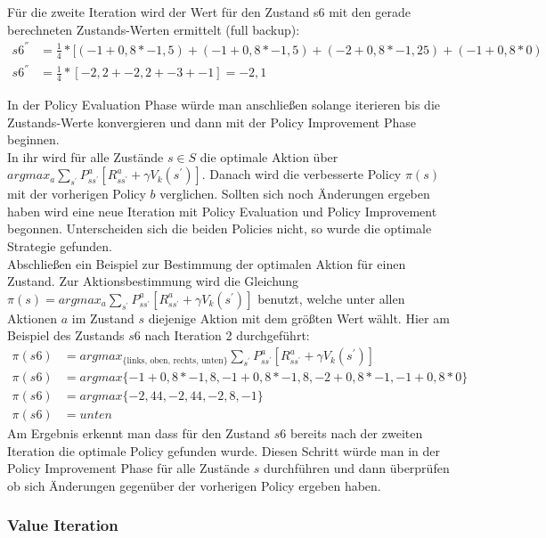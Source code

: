 \documentclass[10pt]{scrartcl}
\begin{document}
Für die zweite Iteration wird der Wert für den Zustand s6 mit den gerade berechneten Zustands-Werten ermittelt (full backup):
\begin{align}
	s6^{''} &= \frac{1}{4} * [(-1 + 0,8 * -1,5) + (-1 + 0,8 * -1,5) + (-2 + 0,8 * -1,25) + (-1 + 0,8 * 0)\\
	s6^{''} &= \frac{1}{4} * [ -2,2 + -2,2 + -3 + -1 ] = -2,1
\end{align}

In der Policy Evaluation Phase würde man anschließen solange iterieren bis die Zustands-Werte konvergieren und dann mit der Policy Improvement Phase beginnen.\\
In ihr wird für alle Zustände $s \in S$ die optimale Aktion über 
$argmax_{a} \sum_{s^{'}} P^a_{ss^{'}} [R^a_{ss^{'}} + \gamma V_{k} (s^{'})]$. 
Danach wird die verbesserte Policy $\pi(s)$ mit der vorherigen Policy $b$ verglichen.
Sollten sich noch Änderungen ergeben haben wird eine neue Iteration mit Policy Evaluation und Policy Improvement begonnen.
Unterscheiden sich die beiden Policies nicht, so wurde die optimale Strategie gefunden.\\

Abschließen ein Beispiel zur Bestimmung der optimalen Aktion für einen Zustand. Zur Aktionsbestimmung wird die Gleichung $\pi(s) = argmax_{a} \sum_{s^{'}} P^a_{ss^{'}} [R^a_{ss^{'}} + \gamma V_{k} (s^{'})]$ benutzt, welche unter allen Aktionen $a$ im Zustand $s$ diejenige Aktion mit dem größten Wert wählt. Hier am Beispiel des Zustands $s6$ nach Iteration 2 durchgeführt:
\begin{align}
	\pi(s6) &= argmax_{\text{\{links, oben, rechts, unten\}}} \sum_{s^{'}} P^a_{ss^{'}} [R^a_{ss^{'}} + \gamma V_{k} (s^{'})]\\	
	\pi(s6) &= argmax \{ -1 + 0,8 * -1,8, -1 + 0,8 * -1,8, -2 + 0,8 * -1, -1 + 0,8 * 0 \}\\
	\pi(s6) &= argmax \{ -2,44, -2,44, -2,8, -1 \}\\
	\pi(s6) &= unten
\end{align}
Am Ergebnis erkennt man dass für den Zustand $s6$ bereits nach der zweiten Iteration die optimale Policy gefunden wurde.
Diesen Schritt würde man in der Policy Improvement Phase für alle Zustände $s$ durchführen und dann überprüfen ob sich Änderungen gegenüber der vorherigen Policy ergeben haben.

\subsubsection{Value Iteration}
\end{document}
